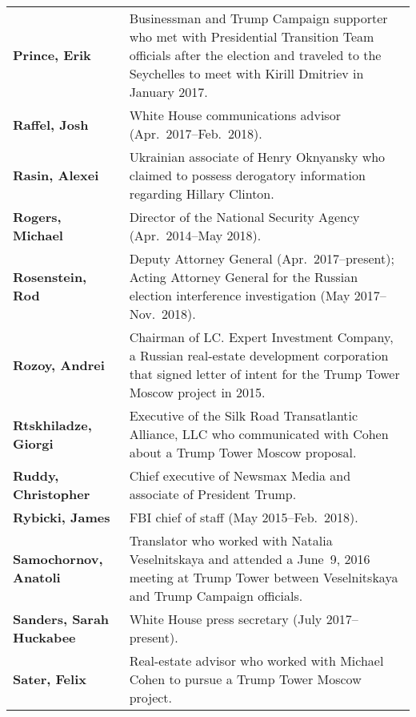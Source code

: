 \begin{longtable}{ p{} p{} }
    \textbf{Prince, Erik} & Businessman and Trump Campaign supporter who met with Presidential Transition Team officials after the election and traveled to the Seychelles to meet with Kirill Dmitriev in January 2017. \\

    \textbf{Raffel, Josh} & White House communications advisor (Apr.~2017--Feb.~2018). \\

    \textbf{Rasin, Alexei} & Ukrainian associate of Henry Oknyansky who claimed to possess derogatory information regarding Hillary Clinton. \\

    \textbf{Rogers, Michael} & Director of the National Security Agency (Apr.~2014--May 2018). \\

    \textbf{Rosenstein, Rod} & Deputy Attorney General (Apr.~2017--present); Acting Attorney General for the Russian election interference investigation (May 2017--Nov.~2018). \\

    \textbf{Rozoy, Andrei} & Chairman of LC. Expert Investment Company, a Russian real-estate development corporation that signed letter of intent for the Trump Tower Moscow project in 2015. \\

    \textbf{Rtskhiladze, Giorgi} & Executive of the Silk Road Transatlantic Alliance, LLC who communicated with Cohen about a Trump Tower Moscow proposal. \\

    \textbf{Ruddy, Christopher} & Chief executive of Newsmax Media and associate of President Trump. \\

    \textbf{Rybicki, James} & FBI chief of staff (May 2015--Feb.~2018). \\

    \textbf{Samochornov, Anatoli} & Translator who worked with Natalia Veselnitskaya and attended a June~9, 2016 meeting at Trump Tower between Veselnitskaya and Trump Campaign officials. \\

    \textbf{Sanders, Sarah Huckabee} & White House press secretary (July 2017--present). \\

    \textbf{Sater, Felix} & Real-estate advisor who worked with Michael Cohen to pursue a Trump Tower Moscow project. \\


\end{longtable}
